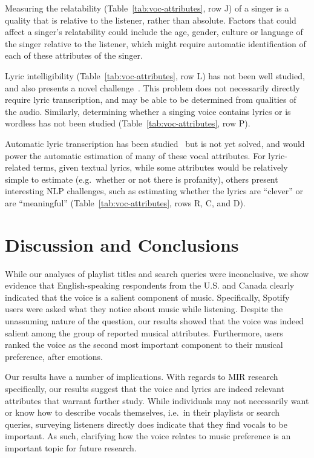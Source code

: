\documentclass{article}
\begin{document}
Measuring the relatability (Table~\ref{tab:voc-attributes}, row J) of a singer is a quality that is relative to the listener, rather than absolute.
Factors that could affect a singer's relatability could include the age, gender, culture or language of the singer relative to the listener, which might require automatic identification of each of these attributes of the singer.

Lyric intelligibility (Table~\ref{tab:voc-attributes}, row L) has not been well studied, and also presents a novel challenge~\cite{ibrahim2017intelligibility}.
This problem does not necessarily directly require lyric transcription, and may be able to be determined from qualities of the audio.
Similarly, determining whether a singing voice contains lyrics or is wordless has not been studied (Table~\ref{tab:voc-attributes}, row P).

Automatic lyric transcription has been studied~\cite{mcvicar2014leveraging,kruspe2016retrieval} but is not yet solved, and would power the automatic estimation of many of these vocal attributes.
For lyric-related terms, given textual lyrics, while some attributes would be relatively simple to estimate (e.g.~whether or not there is profanity), others present interesting NLP challenges, such as estimating whether the lyrics are ``clever'' or are ``meaningful'' (Table~\ref{tab:voc-attributes}, rows R, C, and D).

\section{Discussion and Conclusions}

While our analyses of playlist titles and search queries were inconclusive, we show evidence that English-speaking respondents from the U.S. and Canada clearly indicated that the voice is a salient component of music.
Specifically, Spotify users were asked what they notice about music while listening.
Despite the unassuming nature of the question, our results showed that the voice was indeed salient among the group of reported musical attributes.
Furthermore, users ranked the voice as the second most important component to their musical preference, after emotions.

Our results have a number of implications.
With regards to MIR research specifically, our results suggest that the voice and lyrics are indeed relevant attributes that warrant further study.
While individuals may not necessarily want or know how to describe vocals themselves, i.e.~in their playlists or search queries, surveying listeners directly does indicate that they find vocals to be important.
As such, clarifying how the voice relates to music preference is an important topic for future research.
\end{document}
